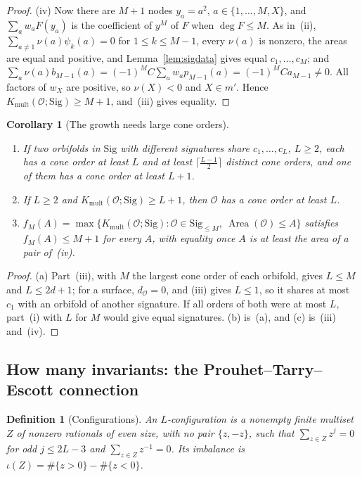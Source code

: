 \documentclass[pdflatex,sn-mathphys-num]{sn-jnl}
\theoremstyle{thmstyleone}%
\newtheorem{corollary}[theorem]{Corollary}%
\theoremstyle{thmstylethree}%
\newtheorem{definition}[theorem]{Definition}%
\newcommand{\Orb}{\mathcal{O}}
\newcommand{\Sig}{\mathrm{Sig}}
\newcommand{\Kmult}{K_{\mathrm{mult}}}
\newcommand{\Area}{\operatorname{Area}}
\begin{document}
\begin{proof}
(iv) Now there are $M+1$ nodes $y_a=a^2$, $a\in\{1,\dots,M,X\}$, and $\sum_aw_aF(y_a)$ is the coefficient of $y^M$ of $F$ when $\deg F\le M$. As in~(ii), $\sum_{a\ne1}\nu(a)\psi_k(a)=0$ for $1\le k\le M-1$, every $\nu(a)$ is nonzero, the areas are equal and positive, and Lemma~\ref{lem:sigdata} gives equal $c_1,\dots,c_M$; and $\sum_a\nu(a)b_{M-1}(a)=(-1)^MC\sum_aw_ap_{M-1}(a)=(-1)^MCa_{M-1}\ne0$. All factors of $w_X$ are positive, so $\nu(X)<0$ and $X\in m'$. Hence $\Kmult(\Orb;\Sig)\ge M+1$, and~(iii) gives equality.
\end{proof}

\begin{corollary}[The growth needs large cone orders]\label{cor:bounded}
\leavevmode
\begin{enumerate}[label=(\alph*)]
\item If two orbifolds in $\Sig$ with different signatures share $c_1,\dots,c_L$, $L\ge2$, each has a cone order at least $L$ and at least $\lceil\frac{L-1}2\rceil$ distinct cone orders, and one of them has a cone order at least $L+1$.
\item If $L\ge2$ and $\Kmult(\Orb;\Sig)\ge L+1$, then $\Orb$ has a cone order at least $L$.
\item $f_M(A)=\max\{\Kmult(\Orb;\Sig):\Orb\in\Sig_{\le M},\ \Area(\Orb)\le A\}$ satisfies $f_M(A)\le M+1$ for every $A$, with equality once $A$ is at least the area of a pair of~(iv).
\end{enumerate}
\end{corollary}

\begin{proof}
(a) Part~(iii), with $M$ the largest cone order of each orbifold, gives $L\le M$ and $L\le2d+1$; for a surface, $d_\Orb=0$, and (iii) gives $L\le1$, so it shares at most $c_1$ with an orbifold of another signature. If all orders of both were at most $L$, part~(i) with $L$ for $M$ would give equal signatures. (b) is~(a), and (c) is~(iii) and~(iv).
\end{proof}

\subsection{How many invariants: the Prouhet--Tarry--Escott connection}\label{sec:pte}

\begin{definition}[Configurations]\label{def:config}
An \emph{$L$-configuration} is a nonempty finite multiset $Z$ of nonzero rationals of even size, with no pair $\{z,-z\}$, such that $\sum_{z\in Z}z^j=0$ for odd $j\le2L-3$ and $\sum_{z\in Z}z^{-1}=0$. Its \emph{imbalance} is $\iota(Z)=\#\{z>0\}-\#\{z<0\}$.
\end{definition}
\end{document}
